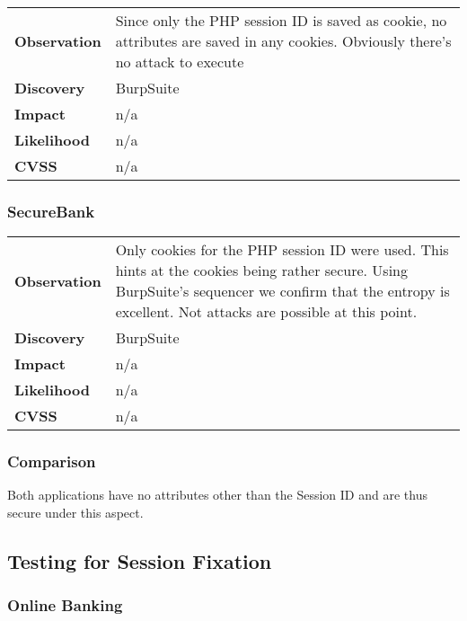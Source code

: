 \begin{tabular}{l|p{10cm}}
\textbf{Observation} & Since only the PHP session ID is saved as cookie, no attributes are saved in any cookies. Obviously there's no attack to execute  \\
\textbf{Discovery} & BurpSuite \\
\textbf{Impact} & n/a \\
\textbf{Likelihood} & n/a \\
\textbf{CVSS} & n/a \\
\end{tabular}

\subsubsection*{SecureBank}

\begin{tabular}{l|p{10cm}}
\textbf{Observation} & Only cookies for the PHP session ID were used. This hints at the cookies being rather secure. Using BurpSuite's sequencer we confirm that the entropy is excellent. Not attacks are possible at this point. \\
\textbf{Discovery} & BurpSuite \\
\textbf{Impact} & n/a \\
\textbf{Likelihood} & n/a \\
\textbf{CVSS} & n/a \\
\end{tabular}

\subsubsection*{Comparison}
Both applications have no attributes other than the Session ID and are thus secure under this aspect.

\clearpage


\subsection{Testing for Session Fixation}

\subsubsection*{Online Banking}

